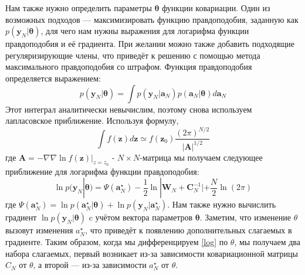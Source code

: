 {Нам также нужно определить параметры $\mathbf{\theta}$ функции ковариации. Один из возможных подходов — максимизировать функцию правдоподобия, заданную как $p(\mathbf{y}_N|\mathbf{\theta})$, для чего нам нужны выражения для логарифма функции правдоподобия и её градиента. При желании можно также добавить подходящие регуляризирующие члены, что приведёт к решению с помощью метода максимального правдоподобия со штрафом. Функция правдоподобия определяется выражением:
\[
    p(\mathbf{y}_N|\mathbf{\theta}) = \int p(\mathbf{y}_N|\mathbf{a}_N)p(\mathbf{a}_N|\mathbf{\theta})d\mathbf{a}_N
\]
Этот интеграл аналитически невычислим, поэтому снова используем лапласовское приближение. Используя формулу,
\[
    \int f(\mathbf{z})d\mathbf{z} \simeq f(\mathbf{z}_0)\frac{(2 \pi)^{N/2}}{|\mathbf{A}|^{1/2}}
\]
где $\mathbf{A}=-\nabla \nabla \ln f(\mathbf{z})|_{z=z_0}$ - $N \times N$-матрица мы получаем следующее приближение для логарифма функции правдоподобия:
\begin{equation}
    \label{log}
    \ln p(\mathbf{y}_N|\mathbf{\theta}) = \Psi(\mathbf{a}_N^{\star}) - \frac{1}{2}\ln|\mathbf{W}_N+ \mathbf{C}_N^{-1}| + \frac{N}{2}\ln(2\pi)
\end{equation}
где $\Psi(\mathbf{a}_N^{\star}) = \ln p(\mathbf{a}_N^{\star}|\mathbf{\theta}) + \ln p(\mathbf{y}_N|\mathbf{a}_N^{\star})$. Нам также нужно вычислить градиент $\ln p(\mathbf{y}_N|\mathbf{\theta})$ c учётом вектора параметров $\mathbf{\theta}$. Заметим, что изменение $\theta$ вызовут изменения $a_N^{\star}$, что приведёт к появлению дополнительных слагаемых в градиенте. Таким образом, когда мы дифференцируем \ref{log} по $\theta$, мы получаем два набора слагаемых, первый возникает из-за зависимости ковариационной матрицы $C_N$ от $\theta$, а второй — из-за зависимости $a_N^{\star}$ от $\theta$.

}
